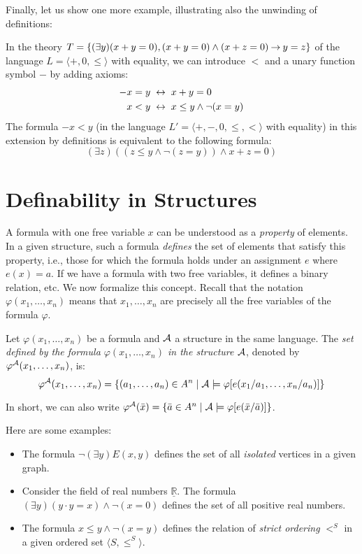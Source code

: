 Finally, let us show one more example, illustrating also the unwinding of definitions:
\begin{example}
    In the theory $T=\{(\exists y)(x+y=0),(x+y=0)\land(x+z=0)\mathbin{\rightarrow} y=z\}$ of the language $L=\langle +,0,\leq\rangle$ with equality, we can introduce $<$ and a unary function symbol $-$ by adding axioms:
    \begin{align*}
        -x=y\ &\mathbin{\leftrightarrow}\ x+y=0\\
        x<y\ &\mathbin{\leftrightarrow}\ x\leq y\land\neg(x=y)
    \end{align*}
    The formula $-x<y$ (in the language $L'=\langle +,-,0,\leq,<\rangle$ with equality) in this extension by definitions is equivalent to the following formula:
    $$
    (\exists z)((z\leq y\land\neg(z=y))\land x+z=0)
    $$
\end{example}


\section{Definability in Structures}\label{section:definability}

A formula with one free variable $x$ can be understood as a \emph{property} of elements. In a given structure, such a formula \emph{defines} the set of elements that satisfy this property, i.e., those for which the formula holds under an assignment $e$ where $e(x)=a$. If we have a formula with two free variables, it defines a binary relation, etc. We now formalize this concept. Recall that the notation $\varphi(x_1,\dots,x_n)$ means that $x_1,\dots,x_n$ are precisely all the free variables of the formula $\varphi$.

\begin{definition}
    Let $\varphi(x_1,\dots,x_n)$ be a formula and $\mathcal{A}$ a structure in the same language. The \emph{set defined by the formula $\varphi(x_1,\dots,x_n)$ in the structure $\mathcal{A}$}, denoted by $\varphi^{\mathcal{A}}(x_1,\dots,x_n)$, is:
    $$
    \varphi^{\mathcal{A}}(x_1,\dots,x_n)=\{(a_1,\dots,a_n)\in A^n\mid\mathcal{A}\models\varphi[e(x_1/a_1,\dots,x_n/a_n)]\}
    $$
\end{definition}
In short, we can also write $\varphi^{\mathcal{A}}(\bar x)=\{\bar a\in A^n\mid\mathcal{A}\models\varphi[e(\bar x/\bar a)]\}$.

\begin{example} Here are some examples:
    \begin{itemize}
        \item The formula $\neg(\exists y)E(x,y)$ defines the set of all \emph{isolated} vertices in a given graph.
        \item Consider the field of real numbers $\underline{\mathbb R}$. The formula $(\exists y)(y\cdot y=x)\land\neg (x=0)$ defines the set of all positive real numbers.
        \item The formula $x\leq y\land \neg (x=y)$ defines the relation of \emph{strict ordering} $<^S$ in a given ordered set $\langle S,\leq^S\rangle$.
    \end{itemize}
\end{example}

